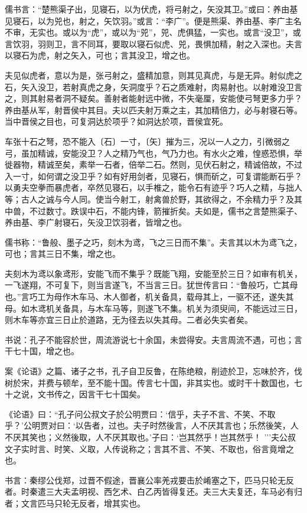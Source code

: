 \documentclass[]{article}
\begin{document}
儒书言：``楚熊渠子出，见寝石，以为伏虎，将弓射之，矢没其卫。''或曰：养由基见寝石，以为兕也，射之，矢饮羽。''或言：``李广''。便是熊渠、养由基、李广主名不审，无实也。或以为``虎''，或以为``兕''，兕、虎俱猛，一实也。或言``没卫''，或言饮羽，羽则卫，言不同耳，要取以寝石似虎、兕，畏惧加精，射之入深也。夫言以寝石为虎，射之矢入，可也；言其没卫，增之也。

夫见似虎者，意以为是，张弓射之，盛精加意，则其见真虎，与是无异。射似虎之石，矢入没卫，若射真虎之身，矢洞度乎？石之质难射，肉易射也。以射难没卫言之，则其射易者洞不疑矣。善射者能射远中微，不失毫厘，安能使弓弩更多力乎？养由基从军，射晋侯中其目。夫以匹夫射万乘之主，其加精倍力，必与射寝石等。当中晋侯之目也，可复洞达於项乎？如洞达於项，晋侯宜死。

车张十石之弩，恐不能入〔石〕一寸，〔矢〕摧为三，况以一人之力，引微弱之弓，虽加精诚，安能没卫？人之精乃气也，气乃力也。有水火之难，惶惑恐惧，举徙器物，精诚至矣，素举一石者，倍举二石。然则，见伏石射之，精诚倍故，不过入一寸，如何谓之没卫乎？如有好用剑者，见寝石，惧而斫之，可复谓能断石乎？以勇夫空拳而暴虎者，卒然见寝石，以手椎之，能令石有迹乎？巧人之精，与拙人等；古人之诚与今人同。使当今射工，射禽兽於野，其欲得之，不余精力乎？及其中兽，不过数寸。跌误中石，不能内锋，箭摧折矣。夫如是，儒书之言楚熊渠子、养由基、李广射寝石，矢没卫饮羽者，皆增之也。

儒书称：``鲁般、墨子之巧，刻木为鸢，飞之三日而不集''。夫言其以木为鸢飞之，可也；言其三日不集，增之也。

夫刻木为鸢以象鸢形，安能飞而不集乎？既能飞翔，安能至於三日？如审有机关，一飞遂翔，不可复下，则当言遂飞，不当言三日。犹世传言曰：``鲁般巧，亡其母也。''言巧工为母作木车马、木人御者，机关备具，载母其上，一驱不还，遂失其母。如木鸢机关备具，与木车马等，则遂飞不集。机关为须臾间，不能远过三日，则木车等亦宜三日止於道路，无为径去以失其母。二者必失实者矣。

书说：孔子不能容於世，周流游说七十余国，未尝得安。夫言周流不遇，可也；言干七十国，增之也。

案《论语》之篇、诸子之书，孔子自卫反鲁，在陈绝粮，削迹於卫，忘味於齐，伐树於宋，并费与顿牟，至不能十国。传言七十国，非其实也。或时干十数国也，七十之说，文书传之，因言干七十国矣。

《论语》曰：``孔子问公叔文子於公明贾曰：`信乎，夫子不言、不笑、不取乎？'公明贾对曰：`以告者，过也。夫子时然後言，人不厌其言也；乐然後笑，人不厌其笑也；义然後取，人不厌其取也。'子曰：`岂其然乎！岂其然乎！
'''夫公叔文子实时言、时笑、义取，人传说称之；言其不言、不笑、不取也，俗言竟增之也。

书言：秦缪公伐郑，过晋不假途，晋襄公率羌戎要击於崤塞之下，匹马只轮无反者。时秦遣三大夫孟明视、西乞术、白乙丙皆得复还。夫三大夫复还，车马必有归者；文言匹马只轮无反者，增其实也。
\end{document}
